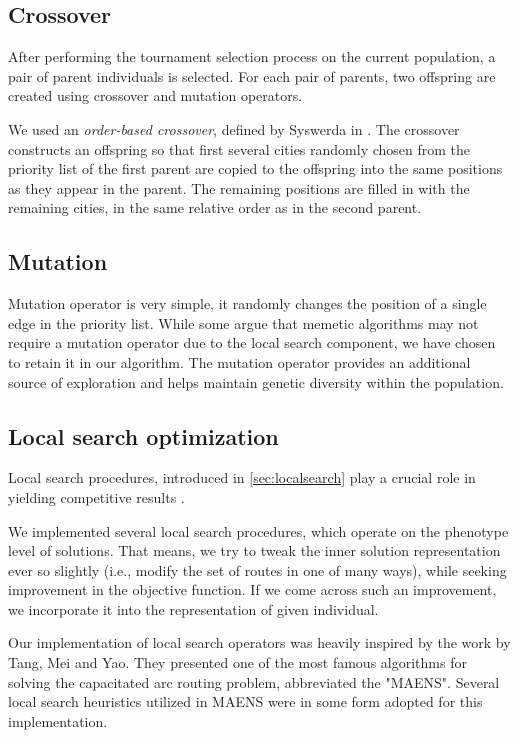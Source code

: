 \documentclass[twoside]{ctuthesis}
\theoremstyle{plain}
\theoremstyle{definition}
\theoremstyle{note}
\begin{document}
\subsection{Crossover}
After performing the tournament selection process on the current population, a pair of parent individuals is selected. For each pair of parents, two offspring are created using crossover and mutation operators. 

We used an \emph{order-based crossover}, defined by Syswerda in \cite{syswerda1991schedule}. The crossover constructs an offspring so that first several cities randomly chosen from the priority list of the first parent are copied to the offspring into the same positions as they appear in the parent. The remaining positions are filled in with the remaining cities, in the same relative order as in the second parent.

\subsection{Mutation}
Mutation operator is very simple, it randomly changes the position of a single edge in the priority list. While some argue that memetic algorithms may not require a mutation operator due to the local search component, we have chosen to retain it in our algorithm. The mutation operator provides an additional source of exploration and helps maintain genetic diversity within the population.

\subsection{Local search optimization}
\label{sec:localsearchcarp}
Local search procedures, introduced in \ref{sec:localsearch} play a crucial role in yielding competitive results \cite{marte2018handbook}.

We implemented several local search procedures, which operate on the phenotype level of solutions. That means, we try to tweak the inner solution representation ever so slightly (i.e., modify the set of routes in one of many ways), while seeking improvement in the objective function. If we come across such an improvement, we incorporate it into the representation of given individual.

Our implementation of local search operators was heavily inspired by the work \cite{tang2009memetic} by Tang, Mei and Yao. They presented one of the most famous algorithms for solving the capacitated arc routing problem, abbreviated the "MAENS". Several local search heuristics utilized in MAENS were in some form adopted for this implementation.
\end{document}
